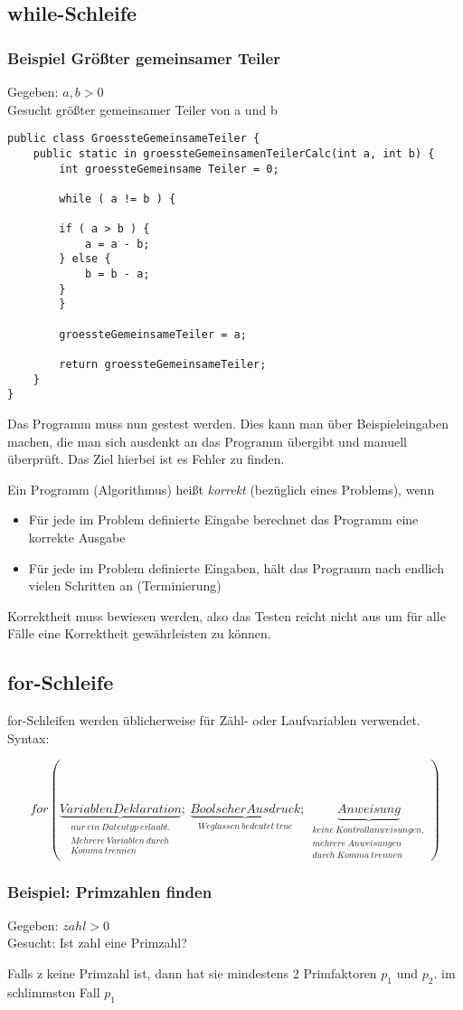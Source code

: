 \subsection{while-Schleife}
\subsubsection{Beispiel Größter gemeinsamer Teiler}

Gegeben: $a, b > 0$\\
Gesucht größter gemeinsamer Teiler von a und b

\begin{verbatim}
public class GroessteGemeinsameTeiler {
	public static in groessteGemeinsamenTeilerCalc(int a, int b) {
		int groessteGemeinsame Teiler = 0;

		while ( a != b ) {

		if ( a > b ) {
			a = a - b;
		} else {
			b = b - a;
		}
		}

		groessteGemeinsameTeiler = a; 

		return groessteGemeinsameTeiler;
	}
}
\end{verbatim}

Das Programm muss nun gestest werden. Dies kann man über Beispieleingaben machen, die man sich ausdenkt an das Programm übergibt und manuell überprüft. Das Ziel hierbei ist es Fehler zu finden.

Ein Programm (Algorithmus) heißt {\em korrekt} (bezüglich eines Problems), wenn
\begin{itemize}
\item Für jede im Problem definierte Eingabe berechnet das Programm eine korrekte Ausgabe
\item Für jede im Problem definierte Eingaben, hält das Programm nach endlich vielen Schritten an (Terminierung)
\end{itemize}
Korrektheit muss bewiesen werden, also das Testen reicht nicht aus um für alle Fälle eine Korrektheit gewährleisten zu können.

\subsection{for-Schleife}
for-Schleifen werden üblicherweise für Zähl- oder Laufvariablen verwendet.
Syntax:

$$for ( \underbrace{VariablenDeklaration}_{\substack{nur\ ein\ Datentyp\ erlaubt. \\ Mehrere\ Variablen\ durch\\ Komma\ trennen}};\ \underbrace{Boolscher Ausdruck}_{\substack{Weglassen\ bedeutet\ true}};\ \underbrace{Anweisung}_{\substack{keine\ Kontrollanweisungen,\\ mehrere\ Anweisungen\\ durch\ Komma\ trennen}}) {
}$$


\subsubsection{Beispiel: Primzahlen finden}

Gegeben: $zahl > 0$ \\
Gesucht: Ist zahl eine Primzahl?

Falls z keine Primzahl ist, dann hat sie mindestens 2 Primfaktoren $p_{1}$ und $p_{2}$.
im schlimmsten Fall $p_{1}$ 

